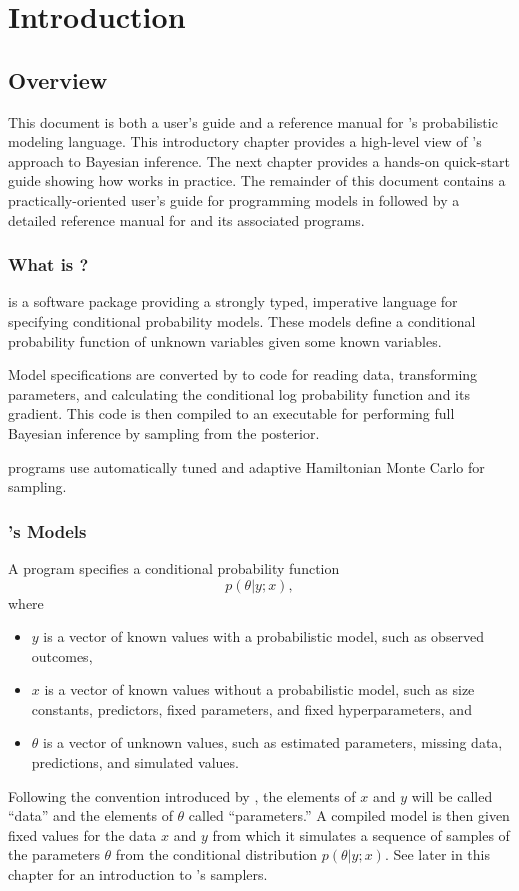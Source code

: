 \part{Introduction}


\chapter{Overview}

This document is both a user's guide and a reference manual for
\Stan's probabilistic modeling language.  This introductory chapter
provides a high-level view of \Stan's approach to Bayesian inference.
The next chapter provides a hands-on quick-start guide showing how
\Stan works in practice.  The remainder of this document contains a
practically-oriented user's guide for programming models in \Stan
followed by a detailed reference manual for \Stan and its associated
programs.

\section{What is \Stan?}

\Stan is a software package providing a strongly typed, imperative
language for specifying conditional probability models.  These models
define a conditional probability function of unknown variables given
some known variables.  

Model specifications are converted by \Stan to \Cpp code for reading
data, transforming parameters, and calculating the conditional log
probability function and its gradient.  This \Cpp code is then
compiled to an executable for performing full Bayesian inference by
sampling from the posterior.  

\Stan programs use automatically tuned and adaptive Hamiltonian Monte
Carlo for sampling.


\section{\Stan's Models}

A \Stan program specifies a conditional probability function
\[
p(\theta|y;x),
\]
where
%
\begin{itemize}
\item $y$ is a vector of known values with a probabilistic model,
  such as observed outcomes,
\item $x$ is a vector of known values without a probabilistic
  model, such as size constants, predictors, fixed
  parameters, and fixed hyperparameters, and
\item $\theta$ is a vector of unknown values, such as estimated
  parameters, missing data, predictions, and simulated values.
\end{itemize}
%
Following the convention introduced by \BUGS, the elements of $x$ and
$y$ will be called ``data'' and the elements of $\theta$ called
``parameters.''  A compiled \Stan model is then given fixed values for
the data $x$ and $y$ from which it simulates a sequence of samples of
the parameters $\theta$ from the conditional distribution
$p(\theta|y;x)$.  See  later in this
chapter for an introduction to \Stan's samplers.

